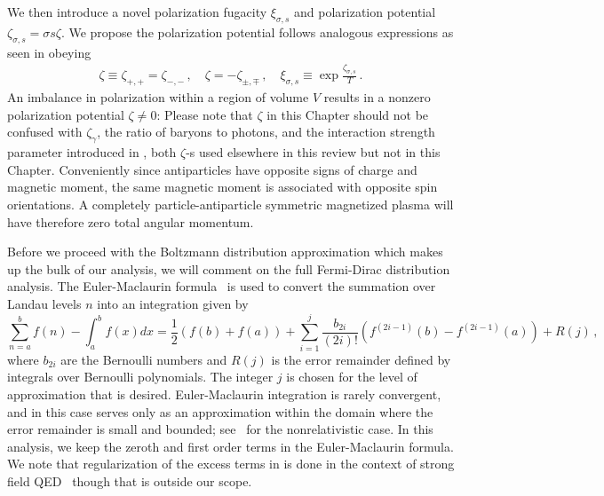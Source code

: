 We then introduce a novel polarization fugacity $\xi_{\sigma,s}$ and polarization potential $\zeta_{\sigma,s}=\sigma s\zeta$. We propose the polarization potential follows analogous expressions as seen in  obeying
\begin{align}
 \label{spotential}
 \zeta\equiv\zeta_{+,+}=\zeta_{-,-}\,,\quad\zeta=-\zeta_{\pm,\mp}\,,\quad\xi_{\sigma,s}\equiv\exp{\frac{\zeta_{\sigma,s}}{T}}\,.
\end{align}
An imbalance in polarization within a region of volume $V$ results in a nonzero polarization potential $\zeta\neq0$: {\color{black}Please note that $\zeta$ in this Chapter should not be confused with $\zeta_\gamma$, the ratio of baryons to photons, and the interaction strength parameter introduced in , both $\zeta$-s used elsewhere in this review but not in this Chapter}. Conveniently since antiparticles have opposite signs of charge and magnetic moment, the same magnetic moment is associated with opposite spin orientations. A completely particle-antiparticle symmetric magnetized plasma will have therefore zero total angular momentum.

\label{sec:eulermac}
\noindent Before we proceed with the Boltzmann distribution approximation which makes up the bulk of our analysis, we will comment on the full Fermi-Dirac distribution analysis. The Euler-Maclaurin formula~\cite{abramowitz1988handbook} is used to convert the summation over Landau levels $n$ into an integration given by
\begin{equation}
 \label{eulermaclaurin}\sum^{b}_{n=a}f(n)-\int^{b}_{a}f(x)dx = \frac{1}{2}\left(f(b)+f(a)\right) 
 +\sum_{i=1}^{j}\frac{b_{2i}}{(2i)!}\left(f^{(2i-1)}(b)-f^{(2i-1)}(a)\right)+R(j)\,,
\end{equation}
where $b_{2i}$ are the Bernoulli numbers and $R(j)$ is the error remainder defined by integrals over Bernoulli polynomials. The integer $j$ is chosen for the level of approximation that is desired. Euler-Maclaurin integration is rarely convergent, and in this case serves only as an approximation within the domain where the error remainder is small and bounded; see~\cite{greiner2012thermodynamics} for the nonrelativistic case. In this analysis, we keep the zeroth and first order terms in the Euler-Maclaurin formula. We note that regularization of the excess terms in  is done in the context of strong field QED~\cite{greiner2008quantum} though that is outside our scope.

